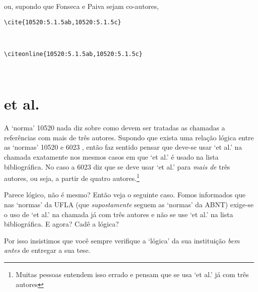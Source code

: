 \documentclass[espacosimples]{abnt}
\newcommand{\VerbL}{0.54\textwidth}
\newcommand{\LatL}{0.45\textwidth}
\begin{document}
ou, supondo que Fonseca e Paiva sejam co-autores,\\
\noindent\begin{minipage}[t]{\VerbL}\small\begin{verbatim}
\cite{10520:5.1.5ab,10520:5.1.5c}
\end{verbatim}\end{minipage}\begin{minipage}[t]{\LatL}\small
\cite{10520:5.1.5ab,10520:5.1.5c}
\end{minipage}\vspace{5mm}\\
\noindent\begin{minipage}[t]{\VerbL}\small\begin{verbatim}
\citeonline{10520:5.1.5ab,10520:5.1.5c}
\end{verbatim}\end{minipage}\begin{minipage}[t]{\LatL}\small
{}
\end{minipage}\vspace{5mm}\\

\section{et al.}

A `norma' 10520 \cite{NBR10520:2001} nada diz sobre como
devem ser tratadas as chamadas a referências com mais de
três autores. Supondo que exista uma relação lógica entre as
`normas' 10520 \cite{NBR10520:2001} e 6023 \cite{NBR6023:2000},
então faz sentido pensar que deve-se usar `et al.'
na chamada exatamente nos mesmos casos em que `et al.' é usado
na lista bibliográfica. No caso a 6023 diz que se deve usar 
`et al.' para \emph{mais de} três autores, ou seja, a partir de quatro
autores.\footnote{Muitas pessoas entendem isso errado e pensam
que se usa `et al.' já com três autores}

Parece lógico, não é mesmo? Então veja o seguinte caso. 
Fomos informados que nas `normas'
da UFLA (que \emph{supostamente} seguem as `normas' da ABNT) exige-se
o uso de `et al.' na chamada já com três autores e não se use
`et al.' na lista bibliográfica. E agora? Cadê a lógica?

Por isso insistimos que você sempre verifique a `lógica' da sua
instituição \emph{bem antes} de entregar a sua tese.


\end{document}
